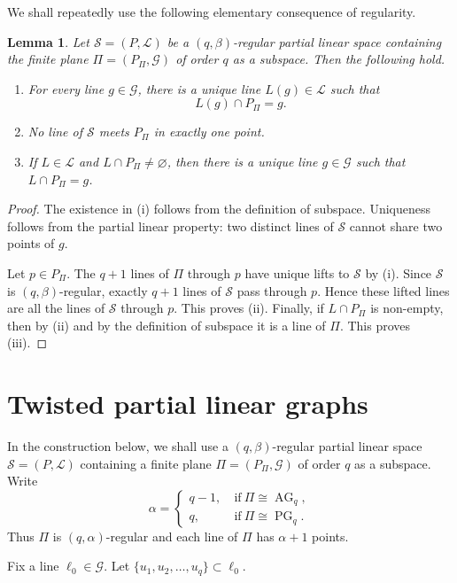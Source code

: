 \documentclass[reqno,a4paper,11pt]{article}
\newtheorem{lem}[thm]{Lemma}
\theoremstyle{definition}
\theoremstyle{remark}
\newcommand{\AG}{\operatorname{AG}}
\newcommand{\PG}{\operatorname{PG}}
\begin{document}
We shall repeatedly use the following elementary consequence of regularity.

\begin{lem}\label{lem:trace-lift}
Let $\mathcal S=(P,\mathcal L)$ be a $(q,\beta)$-regular partial linear space containing the finite plane $\Pi=(P_\Pi,\mathcal G)$ of order $q$ as a subspace.
Then the following hold.
\begin{enumerate}[label=\textup{(\roman*)}]
\item For every line $g\in\mathcal G$, there is a unique line $L(g)\in\mathcal L$ such that
\[
L(g)\cap P_\Pi=g.
\]
\item No line of $\mathcal S$ meets $P_\Pi$ in exactly one point.
\item If $L\in\mathcal L$ and $L\cap P_\Pi\ne \varnothing$, then
there is a unique line $g\in \mathcal{G}$ such that $L\cap P_\Pi=g$.
\end{enumerate}
\end{lem}

\begin{proof}
The existence in (i) follows from the definition of subspace.
Uniqueness follows from the partial linear property: two distinct lines of $\mathcal S$ cannot share two points of $g$.

Let $p\in P_\Pi$.
The $q+1$ lines of $\Pi$ through $p$ have unique lifts to $\mathcal S$ by (i).
Since $\mathcal S$ is $(q,\beta)$-regular, exactly $q+1$ lines of $\mathcal S$ pass through $p$.
Hence these lifted lines are all the lines of $\mathcal S$ through $p$.
This proves (ii).
Finally, if $L\cap P_\Pi$ is non-empty, then by (ii) and by the definition of subspace it is a line of $\Pi$.
This proves (iii).
\end{proof}

\section{Twisted partial linear graphs}\label{sec:twisted}
In the construction below, we shall use a $(q,\beta)$-regular partial linear space
\(\mathcal S=(P,\mathcal L)\) containing a finite plane
\(\Pi=(P_\Pi,\mathcal G)\) of order \(q\) as a subspace.
Write
\[
\alpha=\begin{cases}
	q-1,& ~\text{if} ~\Pi\cong \AG_q,\\
	q,&~\text{if} ~\Pi\cong \PG_q.
\end{cases}
\]
Thus $\Pi$ is $(q,\alpha)$-regular and each line of $\Pi$ has $\alpha+1$ points.

Fix a line $\ell_0\in\mathcal G$.
Let
\(
\{u_1,u_2,\ldots,u_q\}\subset\ell_0.
\)
\end{document}
